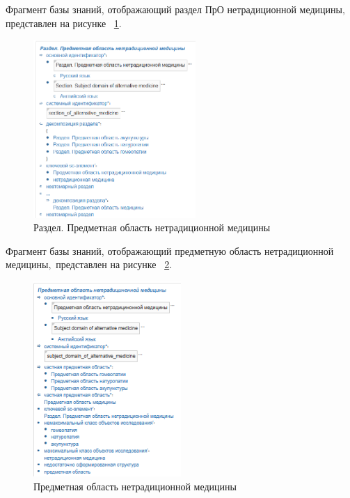 Фрагмент базы знаний, отображающий  раздел ПрО нетрадиционной медицины$,$ представлен на рисунке ~\ref{fig:sections/section_of_alternative_medicine}.
\begin{figure}[H]
	\centering
	\includegraphics[width=0.55\textwidth]{sections/section_of_alternative_medicine.png}
	\caption{Раздел. Предметная область нетрадиционной медицины}
	\label{fig:sections/section_of_alternative_medicine}
\end{figure}

Фрагмент базы знаний, отображающий предметную область нетрадиционной медицины$,$ представлен на рисунке
~\ref{fig:sections/subject_domain_of_alternative_medicine}.
\begin{figure}[H]
	\centering
	\includegraphics[width=0.5\textwidth]{sections/subject_domain_of_alternative_medicine.png}
	\caption{Предметная область нетрадиционной медицины}
	\label{fig:sections/subject_domain_of_alternative_medicine}
\end{figure}


